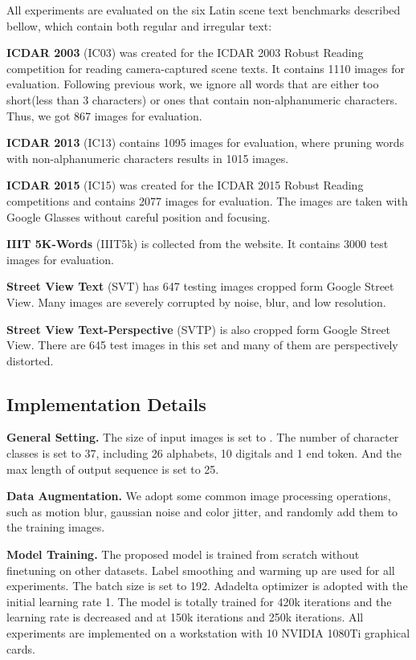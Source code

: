 \documentclass[final]{cvpr}
\begin{document}
All experiments are evaluated on the six Latin scene text benchmarks described bellow, which contain both regular and irregular text:

\textbf{ICDAR 2003} (IC03) \cite{lucas2005icdar} was created for the ICDAR 2003 Robust Reading competition for reading camera-captured scene texts. It contains 1110 images for evaluation. Following previous work\cite{baek2019wrong, lee2020recognizing}, we ignore all words that are either too short(less than 3 characters) or ones that contain non-alphanumeric characters. Thus, we got 867 images for evaluation.

\textbf{ICDAR 2013} (IC13) \cite{karatzas2013icdar} contains 1095 images for evaluation, where pruning words with non-alphanumeric characters results in 1015 images.

\textbf{ICDAR 2015} (IC15) \cite{karatzas2015icdar} was created for the ICDAR 2015 Robust Reading competitions and contains 2077 images for evaluation. The images are taken with Google Glasses without careful position and focusing.

\textbf{IIIT 5K-Words} (IIIT5k) \cite{mishra2012scene} is collected from the website. It contains 3000 test images for evaluation.

\textbf{Street View Text} (SVT) \cite{wang2011end} has 647 testing images cropped form Google Street View. Many images are severely corrupted by noise, blur, and low resolution.

\textbf{Street View Text-Perspective }(SVTP) \cite{phan2013recognizing} is also cropped form Google Street View. There are 645 test images in this set and many of them are perspectively distorted.

\subsection{Implementation Details}
\label{section.implementation_details}

\textbf{General Setting.}
The size of input images is set to . The number of character classes is set to 37, including 26 alphabets, 10 digitals and 1 end token. And the max length of output sequence  is set to 25.

\textbf{Data Augmentation.}
We adopt some common image processing operations, such as motion blur, gaussian noise and color jitter, and randomly add them to the training images.

\textbf{Model Training.}
The proposed model is trained from scratch without finetuning on other datasets. Label smoothing and warming up are used for all experiments. The batch size is set to 192. Adadelta optimizer is adopted with the initial learning rate 1. The model is totally trained for 420k iterations and the learning rate is decreased  and  at 150k iterations and 250k iterations. All experiments are implemented on a workstation with 10 NVIDIA 1080Ti graphical cards.
\end{document}
